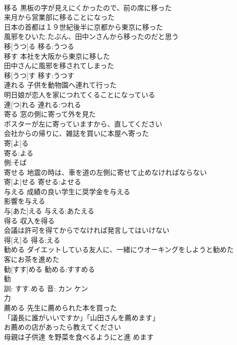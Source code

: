\documentclass[8pt]{extreport}
\begin{document}
\begin{CJK}{UTF8}{min}
\\	移る	黒板の字が見えにくかったので、前の席に移った 
\\	来月から営業部に移ることになった 
\\	日本の首都は１９世紀後半に京都から東京に移った 
\\	風邪をひいた.たぶん、田中ンさんから移ったのだと思う 
\\	移[うつ]る			移る:うつる
\\	移す	本社を大阪から東京に移した 
\\	田中さんに風邪を移されてしまった 
\\	移[うつ]す			移す:うつす
\\	連れる	子供を動物園へ連れて行った 
\\	明日娘が恋人を家につれてくることになっている 
\\	連[つ]れる			連れる:つれる
\\	寄る	窓の側に寄って外を見た 
\\	ポスターが左に寄っていますから、直してください 
\\	会社からの帰りに、雑誌を買いに本屋へ寄った 
\\	寄[よ]る		
\\	寄る:よる
\\	側:そば
\\	寄せる	地震の時は、車を道の左側に寄せて止めなければならない 
\\	寄[よ]せる			寄せる:よせる
\\	与える	成績の良い学生に奨学金を与える 
\\	影響を与える 
\\	与[あた]える			与える:あたえる
\\	得る	収入を得る 
\\	会議は許可を得てからでなければ発言してはいけない 
\\	得[え]る			得る:える
\\	勧める	ダイエットしている友人に、一緒にウオーキングをしようと勧めた 
\\	客にお茶を進めた 
\\	勧[すす]める			勧める:すすめる
\\	勧 
\\	訓: すす.める 音: カン ケン 
\\	力 
\\	薦める	先生に薦められた本を買った 
\\	「議長に誰がいいですか」「山田さんを薦めます」 
\\	お薦めの店があったら教えてください 
\\	母親は子供達 を野菜を食べるようにと進 めます 

\end{CJK}
\end{document}
